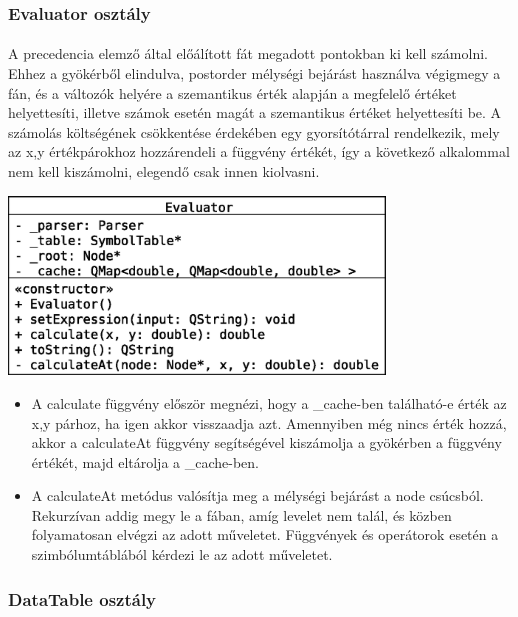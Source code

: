 \documentclass[12pt]{report}
\begin{document}
\subsubsection{Evaluator osztály}
\paragraph{}
A precedencia elemző által előálított fát megadott pontokban ki kell számolni. Ehhez a gyökérből elindulva, postorder mélységi bejárást használva végigmegy a fán, és a változók helyére a szemantikus érték alapján a megfelelő értéket helyettesíti, illetve számok esetén magát a szemantikus értéket helyettesíti be. A számolás költségének csökkentése érdekében egy gyorsítótárral rendelkezik, mely az x,y értékpárokhoz hozzárendeli a függvény értékét, így a következő alkalommal nem kell kiszámolni, elegendő csak innen kiolvasni.
\begin{center}
\includegraphics[width=10cm]{pics/uml/Evaluator}
\end{center}
\begin{itemize}
\item A calculate függvény először megnézi, hogy a \_cache-ben található-e érték az x,y párhoz, ha igen akkor visszaadja azt. Amennyiben még nincs érték hozzá, akkor a calculateAt függvény segítségével kiszámolja a gyökérben a függvény értékét, majd eltárolja a \_cache-ben.
\item A calculateAt metódus valósítja meg a mélységi bejárást a node csúcsból. Rekurzívan addig megy le a fában, amíg levelet nem talál, és közben folyamatosan elvégzi az adott műveletet. Függvények és operátorok esetén a szimbólumtáblából kérdezi le az adott műveletet.
\end{itemize}

\subsubsection{DataTable osztály}
\end{document}
